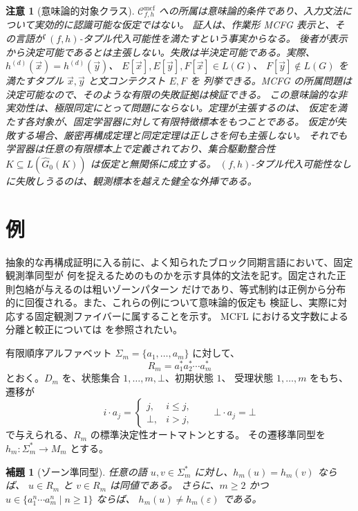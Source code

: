 \documentclass[11pt,a4paper]{ltjsarticle}
\newtheorem{lemma}[theorem]{補題}
\newtheorem{remark}[theorem]{注意}
\theoremstyle{remark}
\newcommand{\Cmcf}[2]{\mathcal{C}^{\mathrm{mcf}}_{#1,#2}}
\newcommand{\tuple}[1]{\vec{#1}}
\newcommand{\eps}{\varepsilon}
\begin{document}
\begin{remark}[意味論的対象クラス]
\label{rem:semantic-class}
\(\Cmcf{f}{h}\) への所属は意味論的条件であり、入力文法について実効的に認識可能な仮定ではない。
証人は、作業形 MCFG 表示と、その言語が \((f,h)\)-タプル代入可能性を満たすという事実からなる。
後者が表示から決定可能であるとは主張しない。失敗は半決定可能である。実際、
\(h^{(d)}(\tuple x)=h^{(d)}(\tuple y)\)、
\(E[\tuple x],E[\tuple y],F[\tuple x]\in L(G)\)、
\(F[\tuple y]\notin L(G)\) を満たすタプル \(\tuple x,\tuple y\) と文コンテクスト \(E,F\) を
列挙できる。MCFG の所属問題は決定可能なので、そのような有限の失敗証拠は検証できる。
この意味論的な非実効性は、極限同定にとって問題にならない。定理が主張するのは、
仮定を満たす各対象が、固定学習器に対して有限特徴標本をもつことである。
仮定が失敗する場合、厳密再構成定理と同定定理は正しさを何も主張しない。
それでも学習器は任意の有限標本上で定義されており、集合駆動整合性
\(K\subseteq L(\widehat G_0(K))\) は仮定と無関係に成立する。
\((f,h)\)-タプル代入可能性なしに失敗しうるのは、観測標本を越えた健全な外挿である。
\end{remark}

\section{例}
\label{sec:running-examples}

抽象的な再構成証明に入る前に、よく知られたブロック同期言語において、固定観測準同型が
何を捉えるためのものかを示す具体的文法を記す。固定された正則包絡が与えるのは粗いゾーンパターン
だけであり、等式制約は正例から分布的に回復される。また、これらの例について意味論的仮定も
検証し、実際に対応する固定観測ファイバーに属することを示す。
MCFL における文字数による分離と較正については \cite{LehnerLindorfer2020} を参照されたい。

有限順序アルファベット \(\Sigma_m=\{a_1,\ldots,a_m\}\) に対して、
\[
  R_m=a_1^*a_2^*\cdots a_m^*
\]
とおく。\(D_m\) を、状態集合 \(1,\ldots,m,\bot\)、初期状態 \(1\)、
受理状態 \(1,\ldots,m\) をもち、遷移が
\[
  i\cdot a_j=
  \begin{cases}
    j, & i\le j,\\
    \bot, & i>j,
  \end{cases}
  \qquad
  \bot\cdot a_j=\bot
\]
で与えられる、\(R_m\) の標準決定性オートマトンとする。
その遷移準同型を \(h_m:\Sigma_m^*\to M_m\) とする。

\begin{lemma}[ゾーン準同型]
\label{lem:zone-morphism-basic}
任意の語 \(u,v\in\Sigma_m^*\) に対し、\(h_m(u)=h_m(v)\) ならば、
\(u\in R_m\) と \(v\in R_m\) は同値である。
さらに、\(m\ge2\) かつ
\(u\in\{a_1^n\cdots a_m^n\mid n\ge1\}\) ならば、
\(h_m(u)\ne h_m(\eps)\) である。
\end{lemma}
\end{document}
